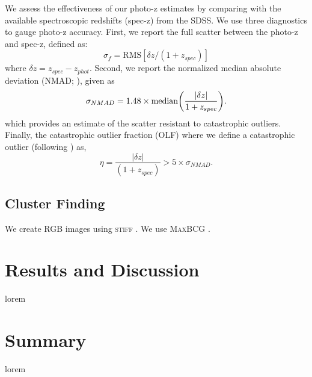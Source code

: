 \documentclass[apj, revtex4]{emulateapj}
\begin{document}
We assess the effectiveness of our photo-z estimates by comparing with the available spectroscopic redshifts (spec-z) from the SDSS. We use three diagnostics to gauge photo-z accuracy. First, we report the full scatter between the photo-z and spec-z, defined as:
\begin{equation}
	\sigma_f = \mathrm{RMS}[\delta z/(1+z_{spec})]
\end{equation}
where $\delta z = z_{spec} - z_{phot}$. Second, we report the normalized median absolute deviation (NMAD; \citealt{Ilbert2009, Dahlen2013, Molino2017}), given as
\begin{equation}
	\sigma_{NMAD} = 1.48 \times \mathrm{median} \bigg{(} \frac{|\delta z|}{1+z_{spec}} \bigg{)}.
\end{equation}   
which provides an estimate of the scatter resistant to catastrophic outliers. Finally, the catastrophic outlier fraction (OLF) where we define a catastrophic outlier (following \citealt{Molino2017}) as,
\begin{equation}
	\eta = \frac{|\delta z|}{(1+z_{spec})} > 5 \times \sigma_{NMAD}.
\end{equation}


\subsection{Cluster Finding}
We create RGB images using \textsc{stiff} \citep{Bertin2011}. We use \textsc{MaxBCG} \citep{Koester2007b}.

\section{Results and Discussion}\label{sec:results}

lorem

\section{Summary}\label{sec:summary}

lorem
\end{document}
